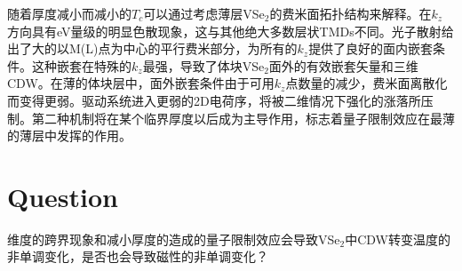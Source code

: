 \documentclass[reprint, aps, prb, showkeys]{revtex4-2}
\begin{document}
随着厚度减小而减小的$T_c$可以通过考虑薄层VSe$_2$的费米面拓扑结构来解释。在$k_z$方向具有eV量级的明显色散现象，这与其他绝大多数层状TMDs不同。光子散射给出了大的以M(L)点为中心的平行费米部分，为所有的$k_z$提供了良好的面内嵌套条件。这种嵌套在特殊的$k_z$最强，导致了体块VSe$_2$面外的有效嵌套矢量和三维CDW。在薄的体块层中，面外嵌套条件由于可用$k_z$点数量的减少，费米面离散化而变得更弱。驱动系统进入更弱的2D电荷序，将被二维情况下强化的涨落所压制。第二种机制将在某个临界厚度以后成为主导作用，标志着量子限制效应在最薄的薄层中发挥的作用。

\section{Question}
维度的跨界现象和减小厚度的造成的量子限制效应会导致VSe$_2$中CDW转变温度的非单调变化，是否也会导致磁性的非单调变化？
\end{document}
